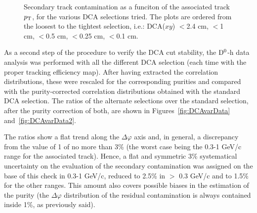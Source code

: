 \begin{figure}[h]
 \caption{Secondary track contamination as a funciton of the associated track $p_{\rm T}$, for the various DCA selections tried. The plots are ordered from the loosest to the tightest selection, i.e.: DCA($xy$) $<$2.4 cm, $<$1 cm, $<$0.5 cm, $<$0.25 cm, $<$0.1 cm.}
 \label{fig:DCAvar}
\end{figure}

As a second step of the procedure to verify the DCA cut stability, the ${\rm D^0}$-h data analysis was performed with all the different DCA selection (each time with the proper tracking efficiency map). After having extracted the correlation distributions, these were rescaled for the corresponding purities and compared with the purity-corrected correlation distributions obtained with the standard DCA selection.
The ratios of the alternate selections over the standard selection, after the purity correction of both, are shown in Figures~\ref{fig:DCAvarData} and~\ref{fig:DCAvarData2}.

The ratios show a flat trend along the $\Delta\varphi$ axis and, in general, a discrepancy from the value of 1 of no more than 3\% (the worst case being the 0.3-1 GeV/c range for the associated track). Hence, a flat and symmetric 3\% systematical uncertainty on the evaluation of the secondary contamination was assigned on the base of this check in 0.3-1 GeV/c, reduced to 2.5\% in $>$ 0.3 GeV/c and to 1.5\% for the other ranges. This amount also covers possible biases in the estimation of the purity (the $\Delta\varphi$ distribution of the residual contamination is always contained inside 1\%, as previously said).

